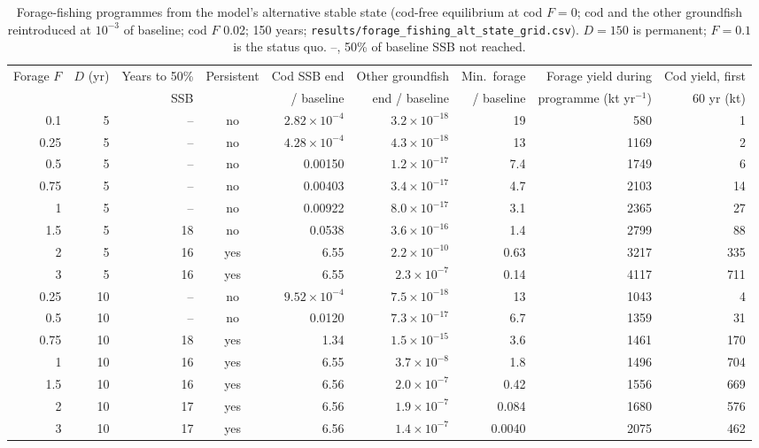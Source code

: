 \documentclass[11pt,letterpaper,fleqn]{article}
\begin{document}
\begin{table}[p]\caption{Forage-fishing programmes from the model's alternative stable state (cod-free equilibrium at cod $F=0$; cod and the other groundfish reintroduced at $10^{-3}$ of baseline; cod $F$ 0.02; 150 years; \nolinkurl{results/forage_fishing_alt_state_grid.csv}). $D=150$ is permanent; $F=0.1$ is the status quo. --, 50\% of baseline SSB not reached.}\label{tab:S-altgrid}
\centering\scriptsize\begin{adjustbox}{max width=\textwidth}\begin{tabular}{@{}rrrcrrrrr@{}}\toprule
Forage $F$ & $D$ (yr) & Years to 50\% & Persistent & Cod SSB end & Other groundfish & Min.\ forage & Forage yield during & Cod yield, first\\
 & & SSB & & / baseline & end / baseline & / baseline & programme (kt yr$^{-1}$) & 60 yr (kt)\\\midrule
0.1 & 5 & -- & no & $2.82\times10^{-4}$ & $3.2\times10^{-18}$ & 19 & 580 & 1\\
0.25 & 5 & -- & no & $4.28\times10^{-4}$ & $4.3\times10^{-18}$ & 13 & 1169 & 2\\
0.5 & 5 & -- & no & 0.00150 & $1.2\times10^{-17}$ & 7.4 & 1749 & 6\\
0.75 & 5 & -- & no & 0.00403 & $3.4\times10^{-17}$ & 4.7 & 2103 & 14\\
1 & 5 & -- & no & 0.00922 & $8.0\times10^{-17}$ & 3.1 & 2365 & 27\\
1.5 & 5 & 18 & no & 0.0538 & $3.6\times10^{-16}$ & 1.4 & 2799 & 88\\
2 & 5 & 16 & yes & 6.55 & $2.2\times10^{-10}$ & 0.63 & 3217 & 335\\
3 & 5 & 16 & yes & 6.55 & $2.3\times10^{-7}$ & 0.14 & 4117 & 711\\
0.25 & 10 & -- & no & $9.52\times10^{-4}$ & $7.5\times10^{-18}$ & 13 & 1043 & 4\\
0.5 & 10 & -- & no & 0.0120 & $7.3\times10^{-17}$ & 6.7 & 1359 & 31\\
0.75 & 10 & 18 & yes & 1.34 & $1.5\times10^{-15}$ & 3.6 & 1461 & 170\\
1 & 10 & 16 & yes & 6.55 & $3.7\times10^{-8}$ & 1.8 & 1496 & 704\\
1.5 & 10 & 16 & yes & 6.56 & $2.0\times10^{-7}$ & 0.42 & 1556 & 669\\
2 & 10 & 17 & yes & 6.56 & $1.9\times10^{-7}$ & 0.084 & 1680 & 576\\
3 & 10 & 17 & yes & 6.56 & $1.4\times10^{-7}$ & 0.0040 & 2075 & 462\\

\end{tabular}
\end{adjustbox}
\end{table}
\end{document}
